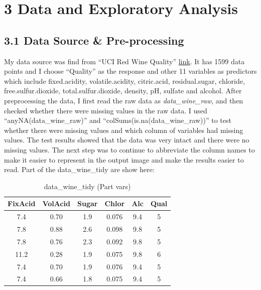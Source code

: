 \documentclass[
  doc,floatsintext]{apa6}
\begin{document}
\newpage

\section{3 Data and Exploratory Analysis}\label{data-and-exploratory-analysis}

\subsection{3.1 Data Source \& Pre-processing}\label{data-source-pre-processing}

My data source was find from ``UCI Red Wine Quality'' \href{https://archive.ics.uci.edu/ml/machine-learning-databases/wine-quality/winequality-red.csv}{link}. It has 1599 data points and I choose ``Quality'' as the response and other 11 variables as predictors which include fixed.acidity, volatile.acidity, citric.acid, residual.sugar, chloride, free.sulfur.dioxide, total.sulfur.dioxide, density, pH, sulfate and alcohol.
After preprocessing the data, I first read the raw data as \emph{data\_wine\_raw}, and then checked whether there were missing values in the raw data. I used ``anyNA(data\_wine\_raw)'' and ``colSums(is.na(data\_wine\_raw))'' to test whether there were missing values and which column of variables had missing values. The test results showed that the data was very intact and there were no missing values. The next step was to continue to abbreviate the column names to make it easier to represent in the output image and make the results easier to read.
Part of the data\_wine\_tidy are show here:

\begin{table}[!h]
\centering
\caption{\label{tab:show-mini-table}data\_wine\_tidy (Part vars)}
\centering
\begin{tabular}[t]{c|c|c|c|c|c}
\hline
FixAcid & VolAcid & Sugar & Chlor & Alc & Qual\\
\hline
7.4 & 0.70 & 1.9 & 0.076 & 9.4 & 5\\
\hline
7.8 & 0.88 & 2.6 & 0.098 & 9.8 & 5\\
\hline
7.8 & 0.76 & 2.3 & 0.092 & 9.8 & 5\\
\hline
11.2 & 0.28 & 1.9 & 0.075 & 9.8 & 6\\
\hline
7.4 & 0.70 & 1.9 & 0.076 & 9.4 & 5\\
\hline
7.4 & 0.66 & 1.8 & 0.075 & 9.4 & 5\\
\hline
\end{tabular}
\end{table}
\end{document}
